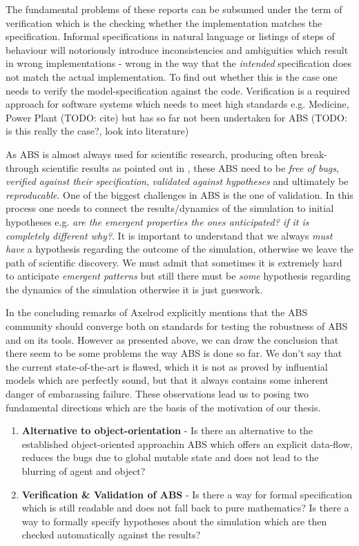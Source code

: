 The fundamental problems of these reports can be subsumed under the term of verification which is the checking whether the implementation matches the specification. Informal specifications in natural language or listings of steps of behaviour will notoriously introduce inconsistencies and ambiguities which result in wrong implementations - wrong in the way that the \textit{intended} specification does not match the actual implementation. To find out whether this is the case one needs to verify the model-specification against the code. Verification is a required approach for software systems which needs to meet high standards e.g. Medicine, Power Plant (TODO: cite) but has so far not been undertaken for ABS (TODO: is this really the case?, look into literature)

As ABS is almost always used for scientific research, producing often break-through scientific results as pointed out in \cite{axelrod_chapter_2006}, these ABS need to be \textit{free of bugs}, \textit{verified against their specification}, \textit{validated against hypotheses} and ultimately be \textit{reproducable}. One of the biggest challenges in ABS is the one of validation. In this process one needs to connect the results/dynamics of the simulation to initial hypotheses e.g. \textit{are the emergent properties the ones anticipated? if it is completely different why?}. It is important to understand that we always \textit{must have} a hypothesis regarding the outcome of the simulation, otherwise we leave the path of scientific discovery. We must admit that sometimes it is extremely hard to anticipate \textit{emergent patterns} but still there must be \textit{some} hypothesis regarding the dynamics of the simulation otherwise it is just gueswork.

In the concluding remarks of \cite{axelrod_chapter_2006} Axelrod explicitly mentions that the ABS community should converge both on standards for testing the robustness of ABS and on its tools. However as presented above, we can draw the conclusion that there seem to be some problems the way ABS is done so far. We don't say that the current state-of-the-art is flawed, which it is not as proved by influential models which are perfectly sound, but that it always contains some inherent danger of embarassing failure. These observations lead us to posing two fundamental directions which are the basis of the motivation of our thesis.

\begin{enumerate}
	\item \textbf{Alternative to object-orientation} - Is there an alternative to the established object-oriented approachin ABS which offers an explicit data-flow, reduces the bugs due to global mutable state and does not lead to the blurring of agent and object?
	\item \textbf{Verification \& Validation of ABS} - Is there a way for formal specification which is still readable and does not fall back to pure mathematics? Is there a way to formally specify hypotheses about the simulation which are then checked automatically against the results?
\end{enumerate}